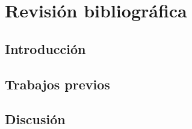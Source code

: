  
\chapter{Revisión bibliográfica}
\section{Introducción}

\section{Trabajos previos}


\section{Discusión}
